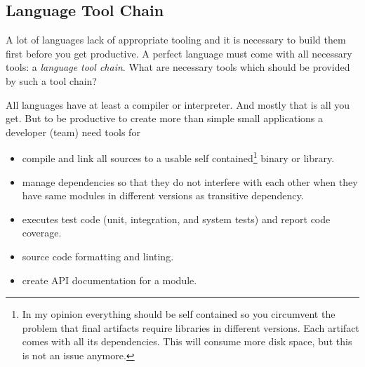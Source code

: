 \documentclass[11pt, a4paper]{report}
\begin{document}
\subsection{Language Tool Chain}

A lot of languages lack of appropriate tooling and it is necessary to build them first before you get productive. A perfect language must come with all necessary tools: a \textit{language tool chain}. What are necessary tools which should be provided by such a tool chain?

All languages have at least a compiler or interpreter. And mostly that is all you get. But to be productive to create more than simple small applications a developer (team) need tools for

\begin{itemize}
    \item compile and link all sources to a usable self contained\footnote{In my opinion everything should be self contained so you circumvent the problem that final artifacts require libraries in different versions. Each artifact comes with all its dependencies. This will consume more disk space, but this is not an issue anymore.} binary or library.
    \item manage dependencies so that they do not interfere with each other when they have same modules in different versions as transitive dependency.
    \item executes test code (unit, integration, and system tests) and report code coverage.
    \item source code formatting and linting.
    \item create API documentation for a module.
\end{itemize}
\end{document}
